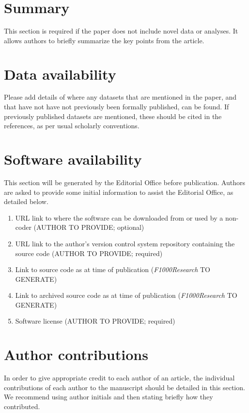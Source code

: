 \documentclass[9pt,a4paper]{extarticle}
\begin{document}
\section*{Summary} %
This section is required if the paper does not include novel data or analyses.  It allows authors to briefly summarize the key points from the article.

\section*{Data availability} %
Please add details of where any datasets that are mentioned in the paper, and that have not have not previously been formally published, can be found.  If previously published datasets are mentioned, these should be cited in the references, as per usual scholarly conventions.

\section*{Software availability}
This section will be generated by the Editorial Office before publication. Authors are asked to provide some initial information to assist the Editorial Office, as detailed below.
\begin{enumerate}
\item URL link to where the software can be downloaded from or used by a non-coder (AUTHOR TO PROVIDE; optional)
\item URL link to the author's version control system repository containing the source code (AUTHOR TO PROVIDE; required)
\item Link to source code as at time of publication ({\textit{F1000Research}} TO GENERATE)
\item Link to archived source code as at time of publication ({\textit{F1000Research}} TO GENERATE)
\item Software license (AUTHOR TO PROVIDE; required)
\end{enumerate}



\section*{Author contributions}
In order to give appropriate credit to each author of an article, the individual
contributions of each author to the manuscript should be detailed in this section. We
recommend using author initials and then stating briefly how they contributed.
\end{document}
